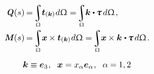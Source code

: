 \nopagebreak\vspace{.1em}\begin{align}
\internalforce \hspace{.1ex} (s) \hspace{-0.2ex}
&= \hspace{-0.3ex} \scalebox{.88}{$ \displaystyle\integral_{\rodsection} $} \hspace{-0.1ex} \tractionvector{\tangenttoaxis} \hspace{.3ex} d\rodsection
= \hspace{-0.3ex} \scalebox{.88}{$ \displaystyle\integral_{\rodsection} $} \hspace{-0.1ex} \tangenttoaxis \dotp \hspace{-0.1ex} \cauchystress \hspace{.3ex} d\rodsection
\hspace{.2ex} ,
\label{stresstensortointernalforce}
\\
%
\internalmoment \hspace{.1ex} (s) \hspace{-0.2ex}
&= \hspace{-0.3ex} \scalebox{.88}{$ \displaystyle\integral_{\rodsection} $} \hspace{-0.1ex} \bm{x} \hspace{-0.1ex} \times \tractionvector{\tangenttoaxis} \hspace{.3ex} d\rodsection
= \hspace{-0.3ex} \scalebox{.88}{$ \displaystyle\integral_{\rodsection} $} \hspace{-0.1ex} \bm{x} \hspace{-0.1ex} \times \tangenttoaxis \hspace{.1ex} \dotp \hspace{-0.1ex} \cauchystress \hspace{.3ex} d\rodsection
\hspace{.2ex} .
\label{stresstensortointernalmoment}
\end{align}

\begin{equation*}
\bm{k} \equiv \bm{e}_3
\hspace{.1ex} , \hspace{.6em}
\bm{x} = x_{\alpha} \bm{e}_\alpha
\hspace{.1ex} , \hspace{.6em}
\alpha \hspace{-0.1ex} = \hspace{-0.1ex} 1, 2
\end{equation*}

